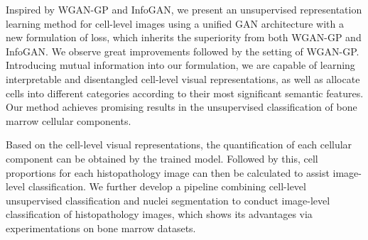 \documentclass[journal]{IEEEtran}
\begin{document}


Inspired by WGAN-GP and InfoGAN, we present an unsupervised representation learning method for cell-level images using a unified GAN architecture with a new formulation of loss, which inherits the superiority from both WGAN-GP and InfoGAN. We observe great improvements followed by the setting of WGAN-GP. Introducing mutual information into our formulation, we are capable of learning interpretable and disentangled cell-level visual representations, as well as allocate cells into different categories according to their most significant semantic features. Our method achieves promising results in the unsupervised classification of bone marrow cellular components.

Based on the cell-level visual representations, the quantification of each cellular component can be obtained by the trained model. Followed by this, cell proportions for each histopathology image can then be calculated to assist image-level classification. We further develop a pipeline combining cell-level unsupervised classification and nuclei segmentation to conduct image-level classification of histopathology images, which shows its advantages via experimentations on bone marrow datasets. 
\end{document}
